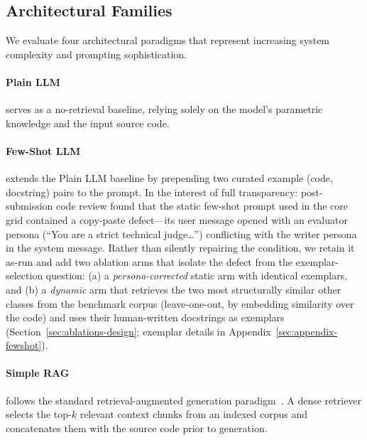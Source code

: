 \documentclass[pdflatex,sn-mathphys-ay]{sn-jnl}%
\theoremstyle{thmstyleone}%
\theoremstyle{thmstyletwo}%
\theoremstyle{thmstylethree}%
\begin{document}
\subsection{Architectural Families}
We evaluate four architectural paradigms that represent increasing system complexity and prompting sophistication.
\paragraph{Plain LLM} serves as a no-retrieval baseline, relying solely on the model's parametric knowledge and the input source code.
\paragraph{Few-Shot LLM} extends the Plain LLM baseline by prepending two curated example (code, docstring) pairs to the prompt. {\color{blue}
In the interest of full transparency: post-submission code review found that the static few-shot prompt used in the core grid contained a copy-paste defect---its user message opened with an evaluator persona (``You are a strict technical judge\ldots'') conflicting with the writer persona in the system message. Rather than silently repairing the condition, we retain it as-run and add two ablation arms that isolate the defect from the exemplar-selection question: (a) a \emph{persona-corrected} static arm with identical exemplars, and (b) a \emph{dynamic} arm that retrieves the two most structurally similar other classes from the benchmark corpus (leave-one-out, by embedding similarity over the code) and uses their human-written docstrings as exemplars (Section~\ref{sec:ablations-design}; exemplar details in Appendix~\ref{sec:appendix-fewshot}).
}

\paragraph{Simple RAG} follows the standard retrieval-augmented generation paradigm~\cite{Lewis2020}. A dense retriever selects the top-$k$ relevant context chunks from an indexed corpus and concatenates them with the source code prior to generation.
\end{document}
